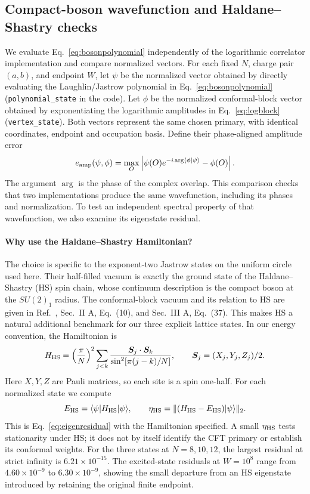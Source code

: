 \subsection{Compact-boson wavefunction and Haldane--Shastry checks}
\label{sec:boson-sanity}
We evaluate Eq.~\eqref{eq:bosonpolynomial} independently of the
logarithmic correlator implementation and compare normalized vectors.
For each fixed $N$, charge pair $(a,b)$, and endpoint $W$, let $\psi$
be the normalized vector obtained by directly evaluating the
Laughlin/Jastrow polynomial in Eq.~\eqref{eq:bosonpolynomial}
(\texttt{polynomial\_state} in the code). Let $\phi$ be the normalized
conformal-block vector obtained by exponentiating the logarithmic
amplitudes in Eq.~\eqref{eq:logblock} (\texttt{vertex\_state}). Both
vectors represent the same chosen primary, with identical coordinates,
endpoint and occupation basis. Define their phase-aligned amplitude error
\begin{equation}
 e_{\rm amp}(\psi,\phi)=
 \max_O\left|\psi(O)e^{-i\arg\langle\phi|\psi\rangle}-\phi(O)\right|.
 \label{eq:amplitudeerror}
\end{equation}
The argument $\arg$ is the phase of the complex overlap. This comparison
checks that two implementations produce the same wavefunction, including
its phases and normalization. To test an independent spectral property
of that wavefunction, we also examine its eigenstate residual.

\paragraph{Why use the Haldane--Shastry Hamiltonian?}
The choice is specific to the exponent-two Jastrow states on the uniform
circle used here. Their half-filled vacuum is exactly the ground state
of the Haldane--Shastry (HS) spin chain, whose continuum description is
the compact boson at the $SU(2)_1$ radius. The conformal-block vacuum
and its relation to HS are given in Ref.~\cite{Herwerth}, Sec.~II A,
Eq.~(10), and Sec.~III A, Eq.~(37). This makes HS a natural additional
benchmark for our three explicit lattice states. In our energy convention,
the Hamiltonian is
\begin{equation}
 H_{\rm HS}=\left(\frac{\pi}{N}\right)^2
 \sum_{j<k}\frac{\bm S_j\cdot\bm S_k}{\sin^2[\pi(j-k)/N]},
 \qquad \bm S_j=(X_j,Y_j,Z_j)/2.
 \label{eq:HHS}
\end{equation}
Here $X,Y,Z$ are Pauli matrices, so each site is a spin one-half.
For each normalized state we compute
\begin{equation}
 E_{\rm HS}=\langle\psi|H_{\rm HS}|\psi\rangle,\qquad
 \eta_{\rm HS}=\|(H_{\rm HS}-E_{\rm HS})\lvert \psi\rangle\|_2.
\end{equation}
This is Eq.~\eqref{eq:eigenresidual} with the Hamiltonian specified.
A small $\eta_{\rm HS}$ tests stationarity under HS; it does not by
itself identify the CFT primary or establish its conformal weights.
For the three states at $N=8,10,12$, the largest residual at strict
infinity is $6.21\times10^{-15}$. The excited-state residuals at
$W=10^8$ range from $4.60\times10^{-9}$ to $6.30\times10^{-9}$,
showing the small departure from an HS eigenstate introduced by retaining
the original finite endpoint.

